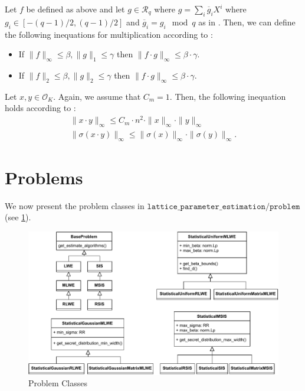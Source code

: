 \documentclass[
  a4paper,  %
  twoside,  %
  bibliography=totoc,
  headsepline,
  cleardoublepage=empty,
  parskip=half,
  draft=false
]{scrbook}
\begin{document}
Let $f$ be defined as above and let $g \in \mathcal{R}_q$ where $g = \sum_i \overline{g}_i X^i$ where $g_i \in \left[-(q-1)/2, (q-1)/2\right]$ and $\overline{g}_i = g_i \mod q$ as in \cite{BDLOP18}. Then, we can define the following inequations for multiplication according to \cite{BDLOP18}:

\begin{itemize}
  \item If $\|f\|_\infty \leq \beta, \|g\|_1 \leq \gamma$ then $\|f \cdot g\|_\infty \leq \beta \cdot \gamma$.
  \item If $\|f\|_2 \leq \beta, \|g\|_2 \leq \gamma$ then $\|f \cdot g\|_\infty \leq \beta \cdot \gamma$.
\end{itemize}

Let $x, y \in \mathcal{O}_K$. Again, we assume that $C_m = 1$. Then, the following inequation holds according to \cite{DPSZ12}:
\begin{align}
  \| x \cdot y \|_\infty \leq C_m \cdot n^2 \cdot \| x \|_\infty \cdot \| y \|_\infty \\
  \| \sigma(x \cdot y) \|_\infty \leq  \| \sigma(x) \|_\infty \cdot \| \sigma(y) \|_\infty.
\end{align}




\section{Problems}
We now present the problem classes in $\texttt{lattice\_parameter\_estimation/problem}$ (see \cref{fig:problem-classes}).

\begin{figure}[h]
  \centering
  \includegraphics[width=1\textwidth]{graphics/problem_classes.pdf}
  \caption{Problem Classes}\label{fig:problem-classes}
\end{figure}
\end{document}
